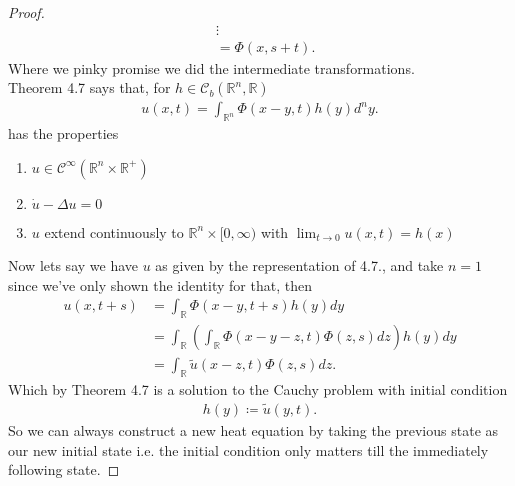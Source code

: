 \begin{proof}
\begin{align*}
                                            &\vdots\\
                                            &= \Phi(x,s+t)
  .\end{align*}
  Where we pinky promise we did the intermediate transformations. \\[1ex]
  Theorem 4.7 says that, for $h \in  \mathcal{C}_b(\mathbb{R}^{n},\mathbb{R} )$
  \begin{align*}
    u(x,t) = \int_{\mathbb{R}^{n} } \Phi(x-y,t)h(y) d^{n} y
  .\end{align*}
  has the properties 
  \begin{enumerate}
    \item $u \in  \mathcal{C}^{\infty}(\mathbb{R}^{n} \times  \mathbb{R}^{+}  ) $
    \item $\dot{u} - \Delta  u  = 0 $
    \item $u$ extend continuously to $\mathbb{R}^{n} \times  [0,\infty) $ with $\lim_{t \to 0} u(x,t) = h(x)$
  \end{enumerate}
  Now lets say we have $u$ as given by the representation of 4.7., and take $n=1$ since we've only shown the identity for that, then 
  \begin{align*}
    u(x,t+s) &= \int_{\mathbb{R} }\Phi(x-y,t+s)h(y) d y  \\
             &= \int_{\mathbb{R} }\left(\int_{\mathbb{R}} \Phi(x-y-z,t)\Phi(z,s) dz \right)h(y) d y\\
             &= \int_{\mathbb{R} }\tilde{u}(x-z,t)\Phi(z,s) d z
  .\end{align*}
Which by Theorem 4.7 is a solution to the Cauchy problem with initial condition
\begin{align*}
  h(y) \coloneqq \tilde{u}(y,t)  
.\end{align*}
So we can always construct a new heat equation by taking the previous state as our new initial state i.e. the initial condition only matters till the immediately following 
state.
\end{proof}
